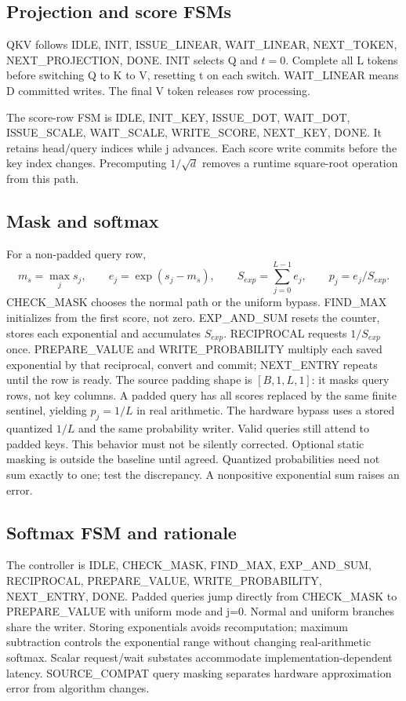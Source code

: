 \documentclass[11pt,a4paper]{article}
\begin{document}
\subsection{Projection and score FSMs}
QKV follows IDLE, INIT, ISSUE\_LINEAR, WAIT\_LINEAR, NEXT\_TOKEN, NEXT\_PROJECTION, DONE. INIT selects Q and $t=0$. Complete all L tokens before switching Q to K to V, resetting t on each switch. WAIT\_LINEAR means D committed writes. The final V token releases row processing.

The score-row FSM is IDLE, INIT\_KEY, ISSUE\_DOT, WAIT\_DOT, ISSUE\_SCALE, WAIT\_SCALE, WRITE\_SCORE, NEXT\_KEY, DONE. It retains head/query indices while j advances. Each score write commits before the key index changes. Precomputing $1/\sqrt d$ removes a runtime square-root operation from this path.

\subsection{Mask and softmax}
For a non-padded query row,
\[
m_s=\max_j s_j,\qquad e_j=\exp(s_j-m_s),\qquad
S_{exp}=\sum_{j=0}^{L-1}e_j,\qquad p_j=e_j/S_{exp}.
\]
CHECK\_MASK chooses the normal path or the uniform bypass. FIND\_MAX initializes from the first score, not zero. EXP\_AND\_SUM resets the counter, stores each exponential and accumulates $S_{exp}$. RECIPROCAL requests $1/S_{exp}$ once. PREPARE\_VALUE and WRITE\_PROBABILITY multiply each saved exponential by that reciprocal, convert and commit; NEXT\_ENTRY repeats until the row is ready.
The source padding shape is $[B,1,L,1]$: it masks query rows, not key columns. A padded query has all scores replaced by the same finite sentinel, yielding $p_j=1/L$ in real arithmetic. The hardware bypass uses a stored quantized $1/L$ and the same probability writer. Valid queries still attend to padded keys. This behavior must not be silently corrected. Optional static masking is outside the baseline until agreed. Quantized probabilities need not sum exactly to one; test the discrepancy. A nonpositive exponential sum raises an error.

\subsection{Softmax FSM and rationale}
The controller is IDLE, CHECK\_MASK, FIND\_MAX, EXP\_AND\_SUM, RECIPROCAL, PREPARE\_VALUE, WRITE\_PROBABILITY, NEXT\_ENTRY, DONE. Padded queries jump directly from CHECK\_MASK to PREPARE\_VALUE with uniform mode and j=0. Normal and uniform branches share the writer. Storing exponentials avoids recomputation; maximum subtraction controls the exponential range without changing real-arithmetic softmax. Scalar request/wait substates accommodate implementation-dependent latency. SOURCE\_COMPAT query masking separates hardware approximation error from algorithm changes.
\end{document}
